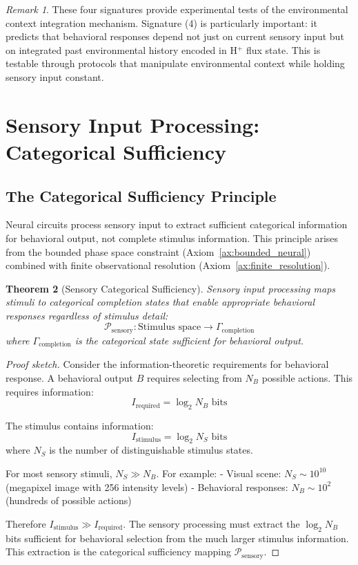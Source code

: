 \documentclass[aps,prd,twocolumn,superscriptaddress,floatfix,nofootinbib]{revtex4-2}
\newtheorem{theorem}{Theorem}[section]
\theoremstyle{remark}
\newtheorem{remark}[theorem]{Remark}
\begin{document}
\begin{remark}
These four signatures provide experimental tests of the environmental context integration mechanism. Signature (4) is particularly important: it predicts that behavioral responses depend not just on current sensory input but on integrated past environmental history encoded in H$^+$ flux state. This is testable through protocols that manipulate environmental context while holding sensory input constant.
\end{remark}

\section{Sensory Input Processing: Categorical Sufficiency}
\label{sec:perception}

\subsection{The Categorical Sufficiency Principle}

Neural circuits process sensory input to extract sufficient categorical information for behavioral output, not complete stimulus information. This principle arises from the bounded phase space constraint (Axiom~\ref{ax:bounded_neural}) combined with finite observational resolution (Axiom~\ref{ax:finite_resolution}).

\begin{theorem}[Sensory Categorical Sufficiency]
\label{thm:sufficiency}
Sensory input processing maps stimuli to categorical completion states that enable appropriate behavioral responses regardless of stimulus detail:
\begin{equation}
\mathcal{P}_{\text{sensory}}: \text{Stimulus space} \to \Gamma_{\text{completion}}
\end{equation}
where $\Gamma_{\text{completion}}$ is the categorical state sufficient for behavioral output.
\end{theorem}

\begin{proof}[Proof sketch]
Consider the information-theoretic requirements for behavioral response. A behavioral output $B$ requires selecting from $N_B$ possible actions. This requires information:
$$
I_{\text{required}} = \log_2 N_B \text{ bits}
$$

The stimulus contains information:
$$
I_{\text{stimulus}} = \log_2 N_S \text{ bits}
$$
where $N_S$ is the number of distinguishable stimulus states.

For most sensory stimuli, $N_S \gg N_B$. For example:
- Visual scene: $N_S \sim 10^{10}$ (megapixel image with 256 intensity levels)
- Behavioral responses: $N_B \sim 10^2$ (hundreds of possible actions)

Therefore $I_{\text{stimulus}} \gg I_{\text{required}}$. The sensory processing must extract the $\log_2 N_B$ bits sufficient for behavioral selection from the much larger stimulus information. This extraction is the categorical sufficiency mapping $\mathcal{P}_{\text{sensory}}$.
\end{proof}
\end{document}
